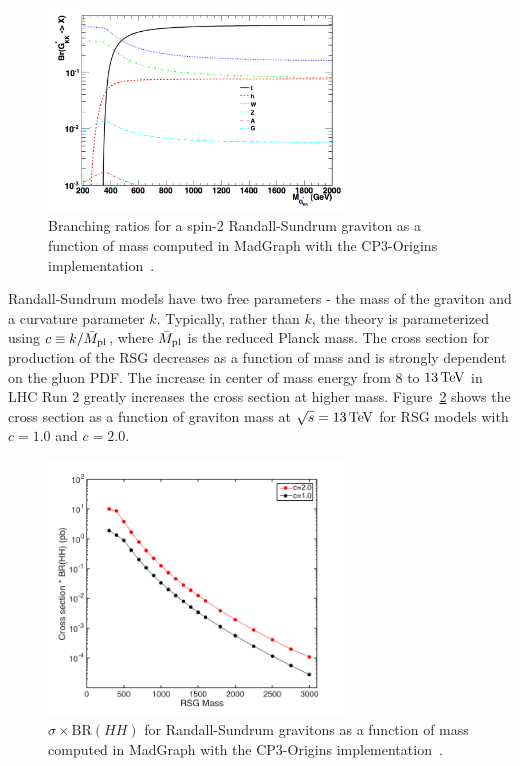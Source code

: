 \begin{figure}[h!]
  \centering
  \captionsetup{justification=centering}

  \includegraphics[width=0.7\textwidth]{figures/G_BR}
   \caption{Branching ratios for a spin-2 Randall-Sundrum graviton as a function of mass computed in MadGraph with the CP3-Origins implementation~\cite{RSG_LHC,MadGraph,CP3Origins}.}
  \label{fig:G_BR}
\end{figure}

Randall-Sundrum models have two free parameters - the mass of the graviton and a curvature parameter $k$. Typically, rather than $k$, the theory is parameterized using $c \equiv k/\bar{M}_{\rm pl}$, where $\bar{M}_{\rm pl}$ is the reduced Planck mass. The cross section for production of the RSG decreases as a function of mass and is strongly dependent on the gluon PDF. The increase in center of mass energy from $8$ to $13 \TeV$ in LHC Run 2 greatly increases the cross section at higher mass. Figure~\ref{fig:G_xsec} shows the cross section as a function of graviton mass at $\sqrt{s} = 13 \TeV$ for RSG models with $c=1.0$ and $c=2.0$. 

\begin{figure}[h!]
  \centering
  \captionsetup{justification=centering}

  \includegraphics[width=0.7\textwidth]{figures/RSG_xsec}
   \caption{$\sigma \times \textrm{BR}(HH)$ for Randall-Sundrum gravitons as a function of mass computed in MadGraph with the CP3-Origins implementation~\cite{RSG_LHC,MadGraph,CP3Origins}.}
  \label{fig:G_xsec}
\end{figure}

